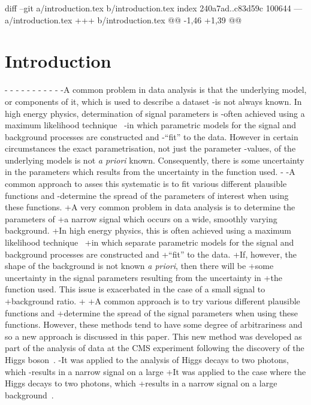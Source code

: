 diff --git a/introduction.tex b/introduction.tex
index 240a7ad..c83d59c 100644
--- a/introduction.tex
+++ b/introduction.tex
@@ -1,46 +1,39 @@
 \section{Introduction} %
 \label{sec:introduction}
 
-%
-%
-%
-%
-%
-%
-%
-%
-%
-
-A common problem in data analysis is that the underlying model, or components of it, which is used to describe a dataset
-is not always known. In high energy physics, determination of signal parameters is
-often achieved using a maximum likelihood technique~\cite{ref:Fisher01011922}
-in which parametric models for the signal and background processes are constructed and
-``fit'' to the data. However in certain circumstances the exact parametrisation, not just the parameter
-values, of the underlying models is not {\it a priori} known. Consequently, there is some uncertainty in the parameters which results from the uncertainty in the function used.
-
-A common approach to asses this systematic is to fit various different plausible functions and
-determine the spread of the parameters of interest when using these functions.
+A very common problem in data analysis is to determine the parameters of
+a narrow signal which occurs on a wide, smoothly varying background. 
+In high energy physics, this is often achieved using a maximum likelihood technique~\cite{ref:Fisher01011922} 
+in which separate parametric models for the signal and background processes are constructed and 
+``fit'' to the data.
+If, however, the shape of the background is not known {\it a priori}, then there will be 
+some uncertainty in the signal parameters resulting from the uncertainty in
+the function used. This issue is exacerbated in the case of a small signal to
+background ratio.
+
+A common approach is to try various different plausible functions and 
+determine the spread of the signal parameters when using these functions.
 However, these methods tend to have some degree of arbitrariness and so
 a new approach is discussed in this paper.
 This new method was developed as part of the analysis of data at the CMS experiment
 following the discovery of the Higgs
 boson~\cite{ref:introduction:atlasdis,ref:introduction:cmsdis}.
-It was applied to the analysis of Higgs decays to two photons, which
-results in a narrow signal on a large
+It was applied to the case where the Higgs decays to two photons, which
+results in a narrow signal on a large 
 background~\cite{ref:introduction:legacy}.
 
